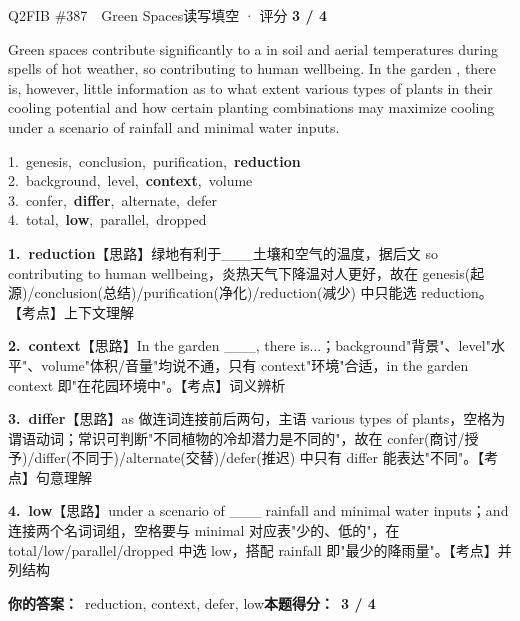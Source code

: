 \begin{qblock}{Q2\quad FIB \#387\ \ Green Spaces}{读写填空 · 评分 \textcolor{cAccent}{\bfseries 3 / 4}}
\begin{promptbox}
Green spaces contribute significantly to a  in soil and aerial temperatures during spells of hot weather, so contributing to human wellbeing. In the garden , there is, however, little information as to what extent various types of plants  in their cooling potential and how certain planting combinations may maximize cooling under a scenario of  rainfall and minimal water inputs.
\end{promptbox}
{\small
1.\ genesis,\ conclusion,\ purification,\ \textbf{reduction}\\
2.\ background,\ level,\ \textbf{context},\ volume\\
3.\ confer,\ \textbf{differ},\ alternate,\ defer\\
4.\ total,\ \textbf{low},\ parallel,\ dropped}
\begin{notebox}\footnotesize
\textbf{1.\ reduction}\quad【思路】绿地有利于\_\_\_土壤和空气的温度，据后文 so contributing to human wellbeing，炎热天气下降温对人更好，故在 genesis(起源)/conclusion(总结)/purification(净化)/reduction(减少) 中只能选 reduction。【考点】上下文理解\par\smallskip
\textbf{2.\ context}\quad【思路】In the garden \_\_\_, there is...；background"背景"、level"水平"、volume"体积/音量"均说不通，只有 context"环境"合适，in the garden context 即"在花园环境中"。【考点】词义辨析\par\smallskip
\textbf{3.\ differ}\quad【思路】as 做连词连接前后两句，主语 various types of plants，空格为谓语动词；常识可判断"不同植物的冷却潜力是不同的"，故在 confer(商讨/授予)/differ(不同于)/alternate(交替)/defer(推迟) 中只有 differ 能表达"不同"。【考点】句意理解\par\smallskip
\textbf{4.\ low}\quad【思路】under a scenario of \_\_\_ rainfall and minimal water inputs；and 连接两个名词词组，空格要与 minimal 对应表"少的、低的"，在 total/low/parallel/dropped 中选 low，搭配 rainfall 即"最少的降雨量"。【考点】并列结构
\end{notebox}
\smallskip
\textbf{你的答案：}\ reduction, context, {\color{cWrong}defer}, low\qquad\textbf{本题得分：}\ {\color{cAccent}\bfseries 3 / 4}
\end{qblock}

